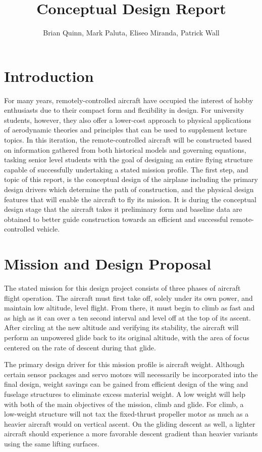 \documentclass[titlepage]{article}
\begin{document}
\title{\textbf{Conceptual Design Report}}
\author{Brian Quinn, Mark Paluta, Eliseo Miranda, Patrick Wall}
\maketitle

\section{Introduction}
For many years, remotely-controlled aircraft have occupied the interest of hobby enthusiasts due to their compact form and flexibility in design. For university students, however, they also offer a lower-cost approach to physical applications of aerodynamic theories and principles that can be used to supplement lecture topics. In this iteration, the remote-controlled aircraft will be constructed based on information gathered from both historical models and governing equations, tasking senior level students with the goal of designing an entire flying structure capable of successfully undertaking a stated mission profile. The first step, and topic of this report, is the conceptual design of the airplane including the primary design drivers which determine the path of construction, and the physical design features that will enable the aircraft to fly its mission. It is during the conceptual design stage that the aircraft takes it preliminary form and baseline data are obtained to better guide construction towards an efficient and successful remote-controlled vehicle.

\section{Mission and Design Proposal}
The stated mission for this design project consists of three phases of aircraft flight operation. The aircraft must first take off, solely under its own power, and maintain low altitude, level flight. From there, it must begin to climb as fast and as high as it can over a ten second interval and level off at the top of its ascent. After circling at the new altitude and verifying its stability, the aircraft will perform an unpowered glide back to its original altitude, with the area of focus centered on the rate of descent during that glide.  

The primary design driver for this mission profile is aircraft weight. Although certain sensor packages and servo motors will necessarily be incorporated into the final design, weight savings can be gained from efficient design of the wing and fuselage structures to eliminate excess material weight. A low weight will help with both of the main objectives of the mission, climb and glide. For climb, a low-weight structure will not tax the fixed-thrust propeller motor as much as a heavier aircraft would on vertical ascent. On the gliding descent as well, a lighter aircraft should experience a more favorable descent gradient than heavier variants using the same lifting surfaces.
\end{document}
